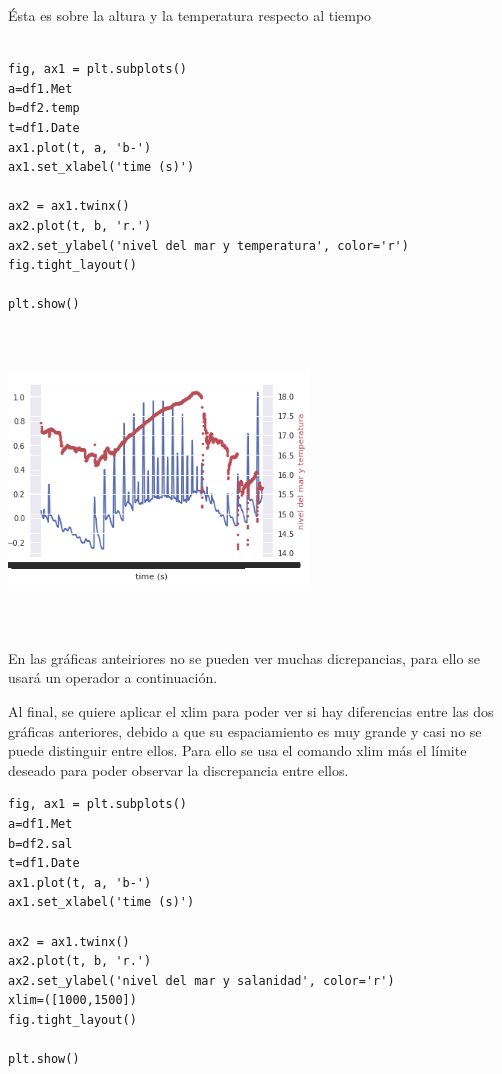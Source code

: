 \documentclass{article}
\begin{document}
Ésta es sobre la altura y la temperatura respecto al tiempo


\begin{verbatim}

fig, ax1 = plt.subplots()
a=df1.Met
b=df2.temp
t=df1.Date
ax1.plot(t, a, 'b-')
ax1.set_xlabel('time (s)')

ax2 = ax1.twinx()
ax2.plot(t, b, 'r.')
ax2.set_ylabel('nivel del mar y temperatura', color='r')
fig.tight_layout()

plt.show()
\end{verbatim}



\begin{center}

\includegraphics[width=8cm, height=8cm]{two2.png}

\end{center}
En las gráficas anteiriores no se pueden ver muchas dicrepancias, para ello se usará un operador a continuación.

Al final, se quiere aplicar el xlim para poder ver si hay diferencias entre las dos gráficas anteriores, debido a que su espaciamiento es muy grande y casi no se puede distinguir entre ellos. Para ello se usa el comando xlim más el límite deseado para poder observar la discrepancia entre ellos.

\begin{verbatim}
fig, ax1 = plt.subplots()
a=df1.Met
b=df2.sal
t=df1.Date
ax1.plot(t, a, 'b-')
ax1.set_xlabel('time (s)')

ax2 = ax1.twinx()
ax2.plot(t, b, 'r.')
ax2.set_ylabel('nivel del mar y salanidad', color='r')
xlim=([1000,1500])
fig.tight_layout()

plt.show()
\end{verbatim}
\end{document}
